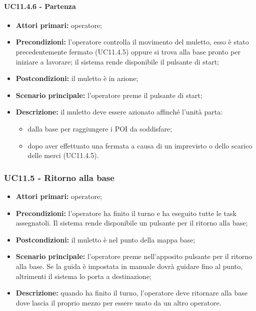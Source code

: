 \paragraph{UC11.4.6 - Partenza}
\begin{itemize}
	\item 	\textbf{Attori primari:} operatore;
	\item 	\textbf{Precondizioni:} l'operatore controlla il movimento del muletto, esso è stato precedentemente fermato (UC11.4.5) oppure si trova alla base pronto per iniziare a lavorare; il sistema rende disponibile il pulsante di start;
	\item 	\textbf{Postcondizioni:} il muletto è in azione;
	\item 	\textbf{Scenario principale:} l'operatore preme il pulsante di start;
	\item 	\textbf{Descrizione:} il muletto deve essere azionato affinché l'unità parta:
	\begin{itemize}
		\item dalla base per raggiungere i POI da soddisfare;
		\item dopo aver effettuato una fermata a causa di un imprevisto o dello scarico delle merci (UC11.4.5).
	\end{itemize}
\end{itemize}


\subsubsection{UC11.5 - Ritorno alla base}
\begin{itemize}
	\item 	\textbf{Attori primari:} operatore;
	\item 	\textbf{Precondizioni:} l'operatore ha finito il turno e ha eseguito tutte le task assegnatoli. Il sistema rende disponibile un pulsante per il ritorno alla base;
	\item 	\textbf{Postcondizioni:} il muletto è nel punto della mappa base;
	\item 	\textbf{Scenario principale:} l'operatore preme nell'apposito pulsante per il ritorno alla base. Se la guida è impostata in manuale dovrà guidare fino al punto, altrimenti il sistema lo porta a destinazione;
	\item 	\textbf{Descrizione:} quando ha finito il turno, l'operatore deve ritornare alla base dove lascia il proprio mezzo per essere usato da un altro operatore.
\end{itemize}

